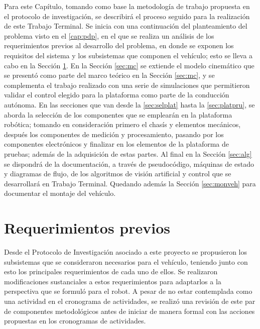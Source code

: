 Para este Capítulo, tomando como base la metodología de trabajo propuesta en el protocolo de investigación, se describirá el proceso seguido para la realización de este Trabajo Terminal. Se inicia con una continuación del planteamiento del problema visto en el \autoref{cap:pdp}, en el que se realiza un análisis de los requerimientos previos al desarrollo del problema, en donde se exponen los requisitos del sistema y los subsistemas que componen el vehículo; esto se lleva a cabo en la Sección \ref{sec:prev}. En la Sección \ref{sec:mc} se extiende el modelo cinemático que se presentó como parte del marco teórico en la Sección \ref{sec:mc}, y se complementa el trabajo realizado con una serie de simulaciones que permitieron validar el control elegido para la plataforma como parte de la conducción autónoma. En las secciones que van desde la \ref{sec:selplat} hasta la \ref{sec:platpru}, se aborda la selección de los componentes que se emplearán en la plataforma robótica; tomando en consideración primero el chasís y elementos mecánicos, después los componentes de medición y procesamiento, pasando por los componentes electrónicos y finalizar en los elementos de la plataforma de pruebas; además de la adquisición de estas partes. Al final en la Sección \ref{sec:alg} se dispondrá de la documentación, a través de pseudocódigo, máquinas de estado y diagramas de flujo, de los algoritmos de visión artificial y control que se desarrollará en Trabajo Terminal. Quedando además la Sección \ref{sec:monveh} para documentar el montaje del vehículo.
\section{Requerimientos previos}
\label{sec:prev}
Desde el Protocolo de Investigación asociado a este proyecto se propusieron los subsistemas que se consideraron necesarios para el vehículo, teniendo junto con esto los principales requerimientos de cada uno de ellos. Se realizaron modificaciones sustanciales a estos requerimientos para adaptarlos a la perspectiva que se formuló para el robot. A pesar de no estar contemplada como una actividad en el cronograma de actividades, se realizó una revisión de este par de componentes metodológicos antes de iniciar de manera formal con las acciones propuestas en los cronogramas de actividades.
